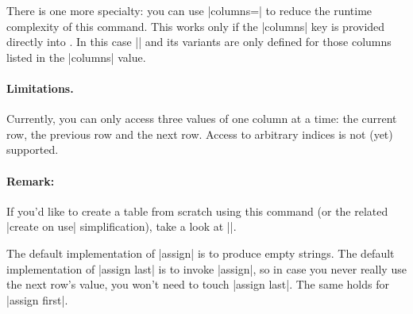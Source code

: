 \documentclass[a4paper]{ltxdoc}
\begin{document}
\begin{command}{\pgfplotstablecreatecol{}}
    There is one more specialty: you can use |columns=| to
    reduce the runtime complexity of this command. This works only if the
    |columns| key is provided directly into . In this case
    |\thisrow| and its variants are only defined for those columns listed in
    the |columns| value.


    \paragraph{Limitations.}

    Currently, you can only access three values of one column at a time: the
    current row, the previous row and the next row. Access to arbitrary indices
    is not (yet) supported.


    \paragraph{Remark:}

    If you'd like to create a table from scratch using this command (or the
    related |create on use| simplification), take a look at
    |\pgfplotstablenew|.

    The default implementation of |assign| is to produce empty strings. The
    default implementation of |assign last| is to invoke |assign|, so in case
    you never really use the next row's value, you won't need to touch
    |assign last|. The same holds for |assign first|.
\end{command}
\end{document}
